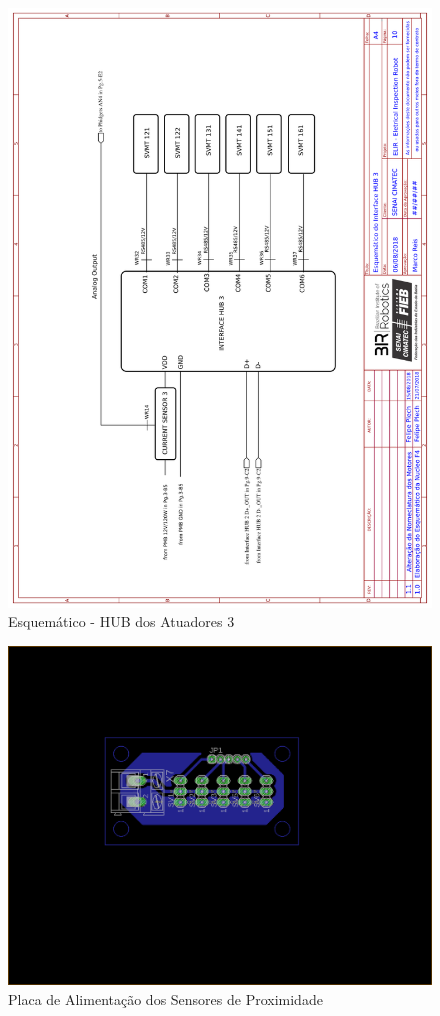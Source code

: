 	
    \begin{figure}[h]
	\centering
	\includegraphics[width=14cm]{Figures/EsquematicoHUB3.png}
	\caption{Esquemático - HUB dos Atuadores 3} \label{HUB3}
	\end{figure}
	
	\pagebreak

	
    \begin{figure}[h]
	\centering
	\includegraphics[width=14cm]{Figures/board.png}
	\caption{Placa de Alimentação dos Sensores de Proximidade} \label{5vHUB}
	\end{figure}